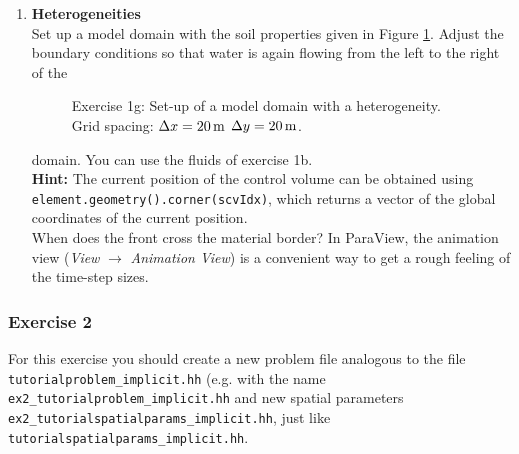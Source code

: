 \begin{enumerate}
\item \textbf{Heterogeneities}  \\
  Set up a model domain with the soil properties given in Figure
  \ref{tutorial-implicit:exercise1_d}. Adjust the boundary conditions
  so that water is again flowing from the left to the right of the
\begin{figure}[ht]
\centering
{}
\caption{Exercise 1g: Set-up of a model domain with a heterogeneity. Grid
spacing: $\Delta x = \unit[20]{m}$ $\Delta y = \unit[20]{m}$.}\label{tutorial-implicit:exercise1_d}
\end{figure}
domain. You can use the fluids of exercise 1b.\\
\textbf{Hint:} The current position of the control volume can be obtained
using \texttt{element\allowbreak.geometry()\allowbreak.corner(scvIdx)}, which
returns a vector of the global coordinates of the current position.\\
When does the front cross the material border? In ParaView, the
animation view (\textit{View} $\rightarrow$ \textit{Animation
  View}) is a convenient way to get a rough feeling of the time-step
sizes.
\end{enumerate}

\subsubsection{Exercise 2}
For this exercise you should create a new problem file analogous to
the file \texttt{tutorialproblem\_implicit.hh} (e.g. with the name
\texttt{ex2\_tutorialproblem\_implicit.hh} and new spatial parameters \texttt{ex2\_tutorial\allowbreak spatialparams\_implicit.hh},
just like \texttt{tutorialspatialparams\_implicit.hh}.

